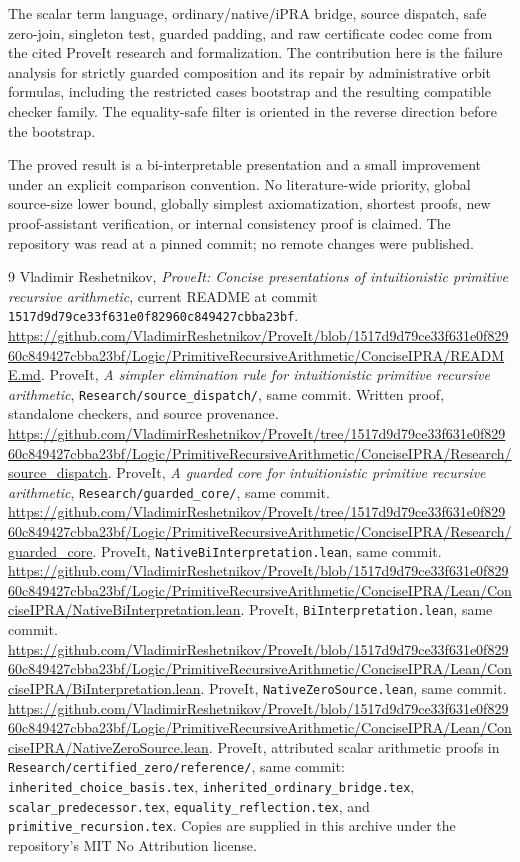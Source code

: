 \documentclass[11pt,letterpaper]{article}
\theoremstyle{definition}\newtheorem{definition}[theorem]{Definition}
\theoremstyle{remark}\newtheorem{remark}[theorem]{Remark}
\newcommand{\file}[1]{{\small\nolinkurl{#1}}}
\begin{document}
The scalar term language, ordinary/native/iPRA bridge, source dispatch,
safe zero-join, singleton test, guarded padding, and raw certificate codec
come from the cited ProveIt research and formalization. The contribution
here is the failure analysis for strictly guarded composition and its repair
by administrative orbit formulas, including the restricted cases bootstrap
and the resulting compatible checker family. The equality-safe filter is
oriented in the reverse direction before the bootstrap.

The proved result is a bi-interpretable presentation and a small improvement
under an explicit comparison convention. No literature-wide priority,
global source-size lower bound, globally simplest axiomatization, shortest
proofs, new proof-assistant verification, or internal consistency proof is
claimed. The repository was read at a pinned commit; no remote changes were
published.

\begin{thebibliography}{9}
 Vladimir Reshetnikov, \emph{ProveIt: Concise presentations of
intuitionistic primitive recursive arithmetic}, current README at commit
\texttt{1517d9d79ce33f631e0f82960c849427cbba23bf}.
\url{https://github.com/VladimirReshetnikov/ProveIt/blob/1517d9d79ce33f631e0f82960c849427cbba23bf/Logic/PrimitiveRecursiveArithmetic/ConciseIPRA/README.md}.
 ProveIt, \emph{A simpler elimination rule for intuitionistic
primitive recursive arithmetic}, \file{Research/source_dispatch/}, same
commit. Written proof, standalone checkers, and source provenance.
\url{https://github.com/VladimirReshetnikov/ProveIt/tree/1517d9d79ce33f631e0f82960c849427cbba23bf/Logic/PrimitiveRecursiveArithmetic/ConciseIPRA/Research/source_dispatch}.
 ProveIt, \emph{A guarded core for intuitionistic primitive
recursive arithmetic}, \file{Research/guarded_core/}, same commit.
\url{https://github.com/VladimirReshetnikov/ProveIt/tree/1517d9d79ce33f631e0f82960c849427cbba23bf/Logic/PrimitiveRecursiveArithmetic/ConciseIPRA/Research/guarded_core}.
 ProveIt, \file{NativeBiInterpretation.lean}, same commit.
\url{https://github.com/VladimirReshetnikov/ProveIt/blob/1517d9d79ce33f631e0f82960c849427cbba23bf/Logic/PrimitiveRecursiveArithmetic/ConciseIPRA/Lean/ConciseIPRA/NativeBiInterpretation.lean}.
 ProveIt, \file{BiInterpretation.lean}, same commit.
\url{https://github.com/VladimirReshetnikov/ProveIt/blob/1517d9d79ce33f631e0f82960c849427cbba23bf/Logic/PrimitiveRecursiveArithmetic/ConciseIPRA/Lean/ConciseIPRA/BiInterpretation.lean}.
 ProveIt, \file{NativeZeroSource.lean}, same commit.
\url{https://github.com/VladimirReshetnikov/ProveIt/blob/1517d9d79ce33f631e0f82960c849427cbba23bf/Logic/PrimitiveRecursiveArithmetic/ConciseIPRA/Lean/ConciseIPRA/NativeZeroSource.lean}.
 ProveIt, attributed scalar arithmetic proofs in
\file{Research/certified_zero/reference/}, same commit:
\file{inherited_choice_basis.tex}, \file{inherited_ordinary_bridge.tex},
\file{scalar_predecessor.tex}, \file{equality_reflection.tex}, and
\file{primitive_recursion.tex}. Copies are supplied in this archive under
the repository's MIT No Attribution license.
\end{thebibliography}
\end{document}

